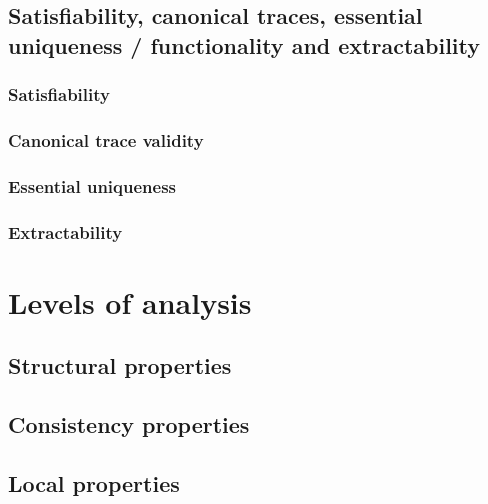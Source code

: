 \subsection{Satisfiability, canonical traces, essential uniqueness / functionality and extractability}         \label{formal: }
\subsubsection{Satisfiability}                                                           \label{formal: satisfiability}
\subsubsection{Canonical trace validity}                                                      \label{formal: canonical}
\subsubsection{Essential uniqueness}                                                         \label{formal: uniqueness}
\subsubsection{Extractability}                                                           \label{formal: extractability}

\section{Levels of analysis}                    
\subsection{Structural properties}                                                           \label{formal: structural}                 
\subsection{Consistency properties}                                                         \label{formal: consistency}                  
\subsection{Local properties}                                                                     \label{formal: local}            
